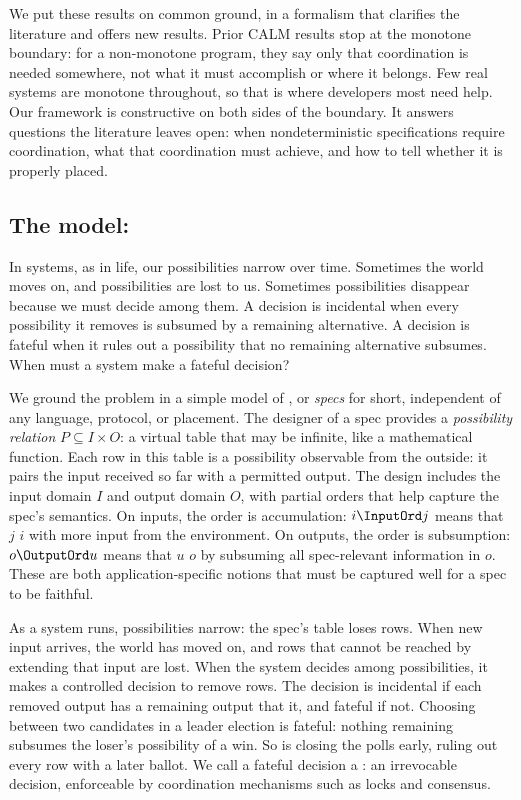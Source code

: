 We put these results on common ground, in a formalism that clarifies the
literature and offers new results.  Prior CALM results stop at the monotone
boundary: for a non-monotone program, they say only that coordination is needed
somewhere, not what it must accomplish or where it belongs.  Few real systems
are monotone throughout, so that is where developers most need help.  Our
framework is constructive on both sides of the boundary.  It answers questions
the literature leaves open: when nondeterministic specifications require
coordination, what that coordination must achieve, and how to tell whether it is
properly placed.

\subsection{The model: \Spectype[s]}
In systems, as in life, our possibilities narrow over time. Sometimes the world
moves on, and possibilities are lost to us. Sometimes possibilities disappear
because we must decide among them. A decision is incidental when
every possibility it removes is subsumed by a remaining alternative. A
decision is fateful when it rules out a possibility that no remaining alternative subsumes. When must a system make a fateful decision?

We ground the problem in a simple model of \emph{\spectype[s]}, or \emph{specs}
for short, independent of any language, protocol, or placement. The designer of
a spec provides a \emph{possibility relation} $P\subseteq I\times O$: a virtual
table that may be infinite, like a mathematical function. Each row in this table
is a possibility observable from the outside: it pairs the input received so far
with a permitted output. The design includes the input domain $I$ and output domain $O$,
with partial orders that help capture the spec's semantics.  On inputs, the order
is accumulation: $i\InputOrd j$ means that $j$ \emph{\inrel} $i$ with more input
from the environment.  On outputs, the order is subsumption: $o\OutputOrd u$
means that  $u$ \emph{\outrel} $o$ by subsuming all spec-relevant information in
$o$. These are both application-specific notions that must be captured well for
a spec to be faithful.

As a system runs, possibilities narrow: the spec's table loses rows.  When new
input arrives, the world has moved on, and rows that cannot be reached by
extending that input are lost.  When the system decides among possibilities, it
makes a controlled decision to remove rows.  The decision is incidental if each
removed output has a remaining output that \outrel it, and fateful if
not.  Choosing between two candidates in a leader election is fateful: nothing
remaining subsumes the loser's possibility of a win.  So is closing the polls early,
ruling out every row with a later ballot.  We call a fateful decision a
\emph{\commitment}: an irrevocable decision, enforceable by coordination
mechanisms such as locks and consensus.

